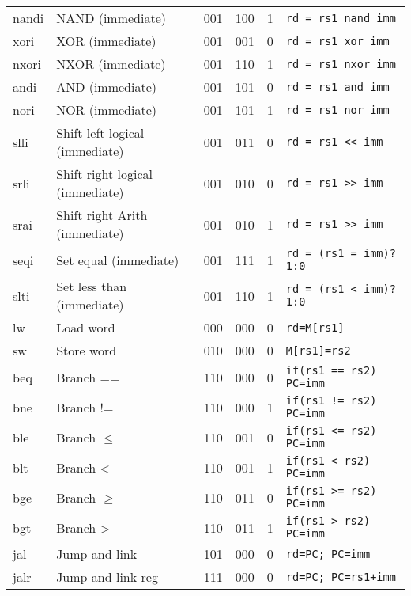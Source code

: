 \documentclass[a4paper]{article}
\begin{document}
\begin{tabular}{|l|l|c|c|c|l|}
        nandi & NAND (immediate)                & 001    & 100    & 1      & \texttt{rd = rs1 nand imm}    \\
        xori  & XOR (immediate)                 & 001    & 001    & 0      & \texttt{rd = rs1 xor imm}     \\
        nxori & NXOR (immediate)                & 001    & 110    & 1      & \texttt{rd = rs1 nxor imm}    \\
        andi  & AND (immediate)                 & 001    & 101    & 0      & \texttt{rd = rs1 and imm}     \\
        nori  & NOR (immediate)                 & 001    & 101    & 1      & \texttt{rd = rs1 nor imm}     \\
        slli  & Shift left logical (immediate)  & 001    & 011    & 0      & \texttt{rd = rs1 << imm}      \\
        srli  & Shift right logical (immediate) & 001    & 010    & 0      & \texttt{rd = rs1 >> imm}      \\
        srai  & Shift right Arith (immediate)   & 001    & 010    & 1      & \texttt{rd = rs1 >> imm}      \\
        seqi  & Set equal (immediate)           & 001    & 111    & 1      & \texttt{rd = (rs1 = imm)?1:0} \\
        slti  & Set less than (immediate)       & 001    & 110    & 1      & \texttt{rd = (rs1 < imm)?1:0} \\
        \hline
        lw    & Load word                       & 000    & 000    & 0      & \texttt{rd=M[rs1]}            \\
        sw    & Store word                      & 010    & 000    & 0      & \texttt{M[rs1]=rs2}           \\
        \hline
        beq   & Branch ==                       & 110    & 000    & 0      & \texttt{if(rs1 == rs2) PC=imm}\\
        bne   & Branch !=                       & 110    & 000    & 1      & \texttt{if(rs1 != rs2) PC=imm}\\
        ble   & Branch \(\leqslant\)            & 110    & 001    & 0      & \texttt{if(rs1 <= rs2) PC=imm}\\
        blt   & Branch <                        & 110    & 001    & 1      & \texttt{if(rs1 < rs2) PC=imm} \\
        bge   & Branch \(\geqslant\)            & 110    & 011    & 0      & \texttt{if(rs1 >= rs2) PC=imm}\\
        bgt   & Branch >                        & 110    & 011    & 1      & \texttt{if(rs1 > rs2) PC=imm} \\

        \hline
        jal  & Jump and link                    & 101    & 000    & 0      &\texttt{rd=PC; PC=imm}         \\
        jalr & Jump and link reg                & 111    & 000    & 0      &\texttt{rd=PC; PC=rs1+imm}     \\
        \hline
    \end{tabular}
\end{document}
